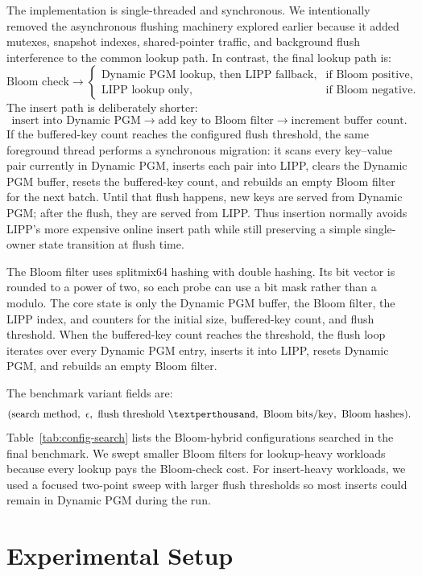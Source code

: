 \documentclass{MITcsail}
\newcommand{\permil}{\textperthousand}
\begin{document}
The implementation is single-threaded and synchronous. We intentionally removed
the asynchronous flushing machinery explored earlier because it added mutexes,
snapshot indexes, shared-pointer traffic, and background flush interference to
the common lookup path. In contrast, the final lookup path is:
\[
\text{Bloom check} \rightarrow
\begin{cases}
\text{Dynamic PGM lookup, then LIPP fallback}, & \text{if Bloom positive},\\
\text{LIPP lookup only}, & \text{if Bloom negative}.
\end{cases}
\]
The insert path is deliberately shorter:
\[
\text{insert into Dynamic PGM} \rightarrow
\text{add key to Bloom filter} \rightarrow
\text{increment buffer count}.
\]
If the buffered-key count reaches the configured flush threshold, the same
foreground thread performs a synchronous migration: it scans every key--value
pair currently in Dynamic PGM, inserts each pair into LIPP, clears the Dynamic
PGM buffer, resets the buffered-key count, and rebuilds an empty Bloom filter
for the next batch. Until that flush happens, new keys are served from Dynamic
PGM; after the flush, they are served from LIPP. Thus insertion normally avoids
LIPP's more expensive online insert path while still preserving a simple
single-owner state transition at flush time.

The Bloom filter uses splitmix64 hashing with double hashing. Its bit vector is
rounded to a power of two, so each probe can use a bit mask rather than a
modulo. The core state is only the Dynamic PGM buffer, the Bloom filter, the
LIPP index, and counters for the initial size, buffered-key count, and flush
threshold. When the buffered-key count reaches the threshold, the flush loop
iterates over every Dynamic PGM entry, inserts it into LIPP, resets Dynamic PGM,
and rebuilds an empty Bloom filter.

The benchmark variant fields are:
\[
(\text{search method},\ \epsilon,\ \text{flush threshold } \permil,\ \text{Bloom bits/key},\ \text{Bloom hashes}).
\]
Table~\ref{tab:config-search} lists the Bloom-hybrid configurations searched in
the final benchmark. We swept smaller Bloom filters for lookup-heavy workloads
because every lookup pays the Bloom-check cost. For insert-heavy workloads, we
used a focused two-point sweep with larger flush thresholds so most inserts
could remain in Dynamic PGM during the run.

\section{Experimental Setup}
\end{document}
